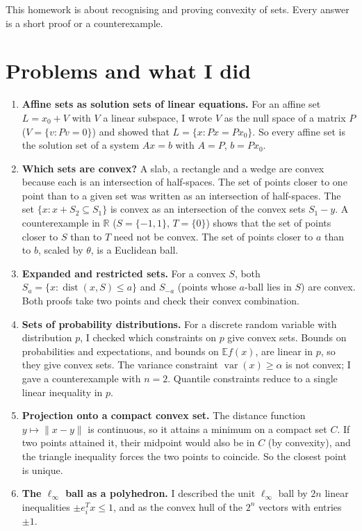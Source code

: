 


This homework is about recognising and proving convexity of sets. Every answer is a short proof or a counterexample.

\section*{Problems and what I did}
\begin{enumerate}
  \item \textbf{Affine sets as solution sets of linear equations.} For an affine set $L = x_0 + V$ with $V$ a linear subspace, I wrote $V$ as the null space of a matrix $P$ ($V=\{v : Pv = 0\}$) and showed that $L = \{x : Px = Px_0\}$. So every affine set is the solution set of a system $Ax=b$ with $A=P$, $b=Px_0$.
  \item \textbf{Which sets are convex?} A slab, a rectangle and a wedge are convex because each is an intersection of half-spaces. The set of points closer to one point than to a given set was written as an intersection of half-spaces. The set $\{x : x + S_2 \subseteq S_1\}$ is convex as an intersection of the convex sets $S_1 - y$. A counterexample in $\mathbb{R}$ ($S=\{-1,1\}$, $T=\{0\}$) shows that the set of points closer to $S$ than to $T$ need not be convex. The set of points closer to $a$ than to $b$, scaled by $\theta$, is a Euclidean ball.
  \item \textbf{Expanded and restricted sets.} For a convex $S$, both $S_a = \{x : \operatorname{dist}(x,S) \le a\}$ and $S_{-a}$ (points whose $a$-ball lies in $S$) are convex. Both proofs take two points and check their convex combination.
  \item \textbf{Sets of probability distributions.} For a discrete random variable with distribution $p$, I checked which constraints on $p$ give convex sets. Bounds on probabilities and expectations, and bounds on $\mathbb{E}f(x)$, are linear in $p$, so they give convex sets. The variance constraint $\operatorname{var}(x) \ge \alpha$ is not convex; I gave a counterexample with $n=2$. Quantile constraints reduce to a single linear inequality in $p$.
  \item \textbf{Projection onto a compact convex set.} The distance function $y \mapsto \|x-y\|$ is continuous, so it attains a minimum on a compact set $C$. If two points attained it, their midpoint would also be in $C$ (by convexity), and the triangle inequality forces the two points to coincide. So the closest point is unique.
  \item \textbf{The $\ell_\infty$ ball as a polyhedron.} I described the unit $\ell_\infty$ ball by $2n$ linear inequalities $\pm e_i^T x \le 1$, and as the convex hull of the $2^n$ vectors with entries $\pm 1$.
\end{enumerate}

